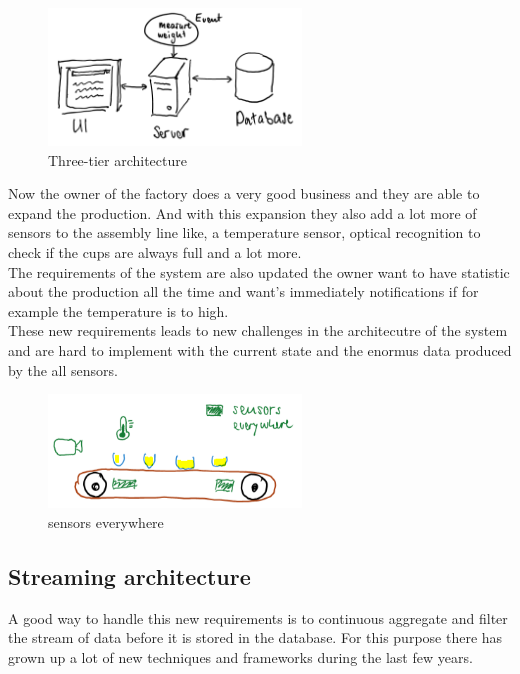 \begin{figure}[H]
\centering
\captionsetup{justification=centering}
\includegraphics[width=0.6\textwidth]{images/three_tier.png}
\caption[Three-tier architecture]{Three-tier architecture}
\end{figure}

\newpage

Now the owner of the factory does a very good business and they are able to expand the production.
And with this expansion they also add a lot more of sensors to the assembly line like, a temperature sensor,
optical recognition to check if the cups are always full and a lot more.\\
The requirements of the system are also updated the owner want to have statistic about the production all the time
and want's immediately notifications if for example the temperature is to high.\\
These new requirements leads to new challenges in the architecutre of the system and are hard to implement with the
current state and the enormus data produced by the all sensors.

\begin{figure}[H]
\centering
\captionsetup{justification=centering}
\includegraphics[width=0.6\textwidth]{images/sensors.png}
\caption[sensors everywhere]{sensors everywhere}
\end{figure}

\subsection{Streaming architecture}
A good way to handle this new requirements is to continuous aggregate and filter the stream of data before it is stored in the database.
For this purpose there has grown up a lot of new techniques and frameworks during the last few years.

